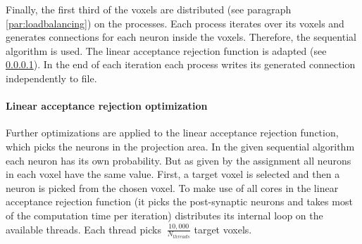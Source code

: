 Finally, the first third of the voxels are distributed (see paragraph \ref{par:loadbalancing}) on the processes.
Each process iterates over its voxels and generates connections for each neuron inside the voxels.
Therefore, the sequential algorithm is used. The linear acceptance rejection function is adapted (see \ref{par:linearacceptancerejection}).
In the end of each iteration each process writes its generated connection independently to file.

\paragraph{Linear acceptance rejection optimization}
\label{par:linearacceptancerejection}
Further optimizations are applied to the linear acceptance rejection function,
which picks the neurons in the projection area.
In the given sequential algorithm each neuron has its own probability.
But as given by the assignment all neurons in each voxel have the same value.
First, a target voxel is selected and then a neuron is picked from the chosen voxel.
To make use of all cores in the linear acceptance rejection function
(it picks the post-synaptic neurons and takes most of the computation time per iteration)
distributes its internal loop on the available threads.
Each thread picks $~ \frac{10,000}{N_{threads}}$ target voxels.


